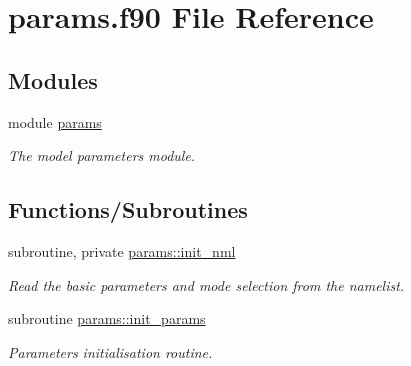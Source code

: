 \hypertarget{params_8f90}{}\section{params.\+f90 File Reference}
\label{params_8f90}
\subsection*{Modules}
\begin{DoxyCompactItemize}
\item 
module \hyperlink{namespaceparams}{params}
\begin{DoxyCompactList}\small\item\em The model parameters module. \end{DoxyCompactList}\end{DoxyCompactItemize}
\subsection*{Functions/\+Subroutines}
\begin{DoxyCompactItemize}
\item 
subroutine, private \hyperlink{namespaceparams_ab21e77dfefda280da4cfdd29117173d5}{params\+::init\+\_\+nml}
\begin{DoxyCompactList}\small\item\em Read the basic parameters and mode selection from the namelist. \end{DoxyCompactList}\item 
subroutine \hyperlink{namespaceparams_aa5d1f7f88b00cf3705691de2f6f92a08}{params\+::init\+\_\+params}
\begin{DoxyCompactList}\small\item\em Parameters initialisation routine. \end{DoxyCompactList}\end{DoxyCompactItemize}
